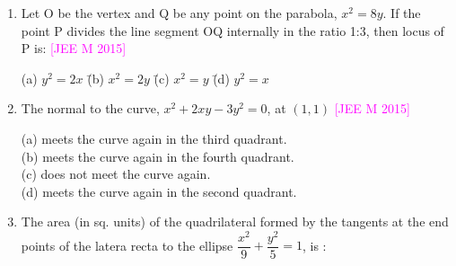 \documentclass[journal,12pt,twocolumn]{IEEEtran}
\theoremstyle{remark}
\begin{document}
\begin{enumerate}[label=\textcolor{magenta}{\arabic*.}]
    \hfill{\textcolor{magenta}{[JEE M 2014]}}
    \begin{tabbing}
        (a) $\dfrac{1}{8}$ \hspace{2em} \= (b) $\dfrac{2}{3}$ \hspace{2em} \= (c) $\dfrac{1}{2}$ \hspace{2em} \= (d) $\dfrac{3}{2}$ \\
    \end{tabbing}
    \item Let O be the vertex and Q be any point on the parabola, $x^2=8y$. If the point P divides the line segment OQ internally in the ratio 1:3, then locus of P is:
    \hfill{\textcolor{magenta}{[JEE M 2015]}}
    \begin{tabbing}
        (a) $y^2=2x$ \hspace{0em} \= (b) $x^2=2y$ \hspace{0em} \= (c) $x^2=y$ \hspace{0em} \= (d) $y^2=x$ \\
    \end{tabbing}
    \item The normal to the curve, $x^2+2xy-3y^2=0$, at $(1,1)$
    \hfill{\textcolor{magenta}{[JEE M 2015]}}

    (a) meets the curve again in the third quadrant.\\
    (b) meets the curve again in the fourth quadrant.\\
    (c) does not meet the curve again.\\
    (d) meets the curve again in the second quadrant.\\
    \item The area (in sq. units) of the quadrilateral formed by the tangents at the end points of the latera recta to the ellipse $\dfrac{x^2}{9}+\dfrac{y^2}{5}=1$, is :
    

\end{enumerate}
\end{document}
